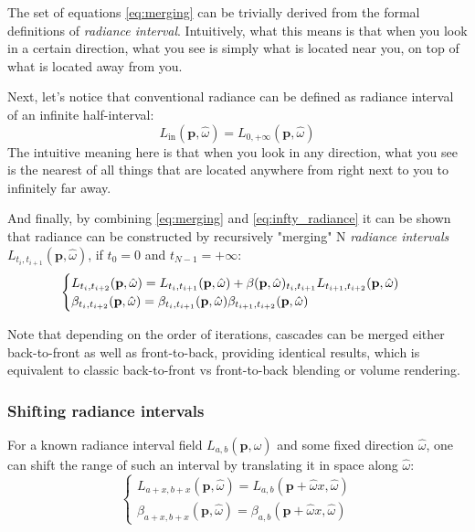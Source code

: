 \documentclass{jcgt}
\begin{document}
The set of equations \ref{eq:merging} can be trivially derived from the formal definitions of \emph{radiance interval}. Intuitively, what this means is that when you look in a certain direction, what you see is simply what is located near you, on top of what is located away from you.

Next, let's notice that conventional radiance can be defined as radiance interval of an infinite half-interval:
\begin{equation}
  L_{\mathrm{in}}(\textbf{p}, \hat \omega) = L_{0,+\infty}(\textbf{p}, \hat \omega)
  \label{eq:infty_radiance}
\end{equation}
The intuitive meaning here is that when you look in any direction, what you see is the nearest of all things that are located anywhere from right next to you to infinitely far away.

And finally, by combining \ref{eq:merging} and \ref{eq:infty_radiance} it can be shown that radiance can be constructed by recursively "merging" N \emph{radiance intervals} $L_{t_i, t_{i+1}}(\textbf{p}, \hat \omega)$, if $t_0 = 0$ and $t_{N-1} = +\infty$:
\begin{equation}
  \begin{cases}
    L_{t_i,t_{i+2}}(\textbf{p}, \hat \omega) = L_{t_i,t_{i+1}}(\textbf{p}, \hat \omega) + \beta(\textbf p, \hat \omega)_{t_i, t_{i+1}}L_{t_{i+1},t_{i+2}}(\textbf{p}, \hat \omega)\\
    \beta_{t_i, t_{i+2}}(\textbf p, \hat \omega) = \beta_{t_i, t_{i+1}}(\textbf p, \hat \omega)\beta_{t_{i+1}, t_{i+2}}(\textbf p, \hat \omega)
    \label{eq:recursive_merging}
  \end{cases}
\end{equation}

Note that depending on the order of iterations, cascades can be merged either back-to-front as well as front-to-back, providing identical results, which is equivalent to classic back-to-front vs front-to-back blending or volume rendering.

\subsubsection{Shifting radiance intervals}
For a known radiance interval field
$L_{a,b}(\textbf{p}, \hat \omega)$
and some fixed direction $\hat \omega$, one can shift the range of such an interval by translating it in space along $\hat \omega$:
\begin{equation}
  \begin{cases}
    L_{a + x,b + x}(\textbf{p}, \hat \omega)=
      L_{a,b}(\textbf{p} + \hat \omega x, \hat \omega) \\
    \beta_{a + x,b + x}(\textbf{p}, \hat \omega)=
      \beta_{a,b}(\textbf{p} + \hat \omega x, \hat \omega)
  \end{cases}
  \label{eq:radiance_interval_shifting}
\end{equation}
\end{document}
